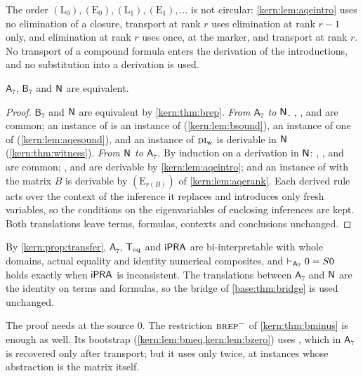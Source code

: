 The order $(\mathrm L_0),(\mathrm E_0),(\mathrm L_1),(\mathrm E_1),\dots$ is
not circular: \cref{kern:lem:aqeintro} uses no elimination of a closure,
transport at rank $r$ uses elimination at rank $r-1$ only, and elimination at
rank $r$ uses  once, at the marker, and transport at rank $r$.
No transport of a compound formula enters the derivation of the
introductions, and no substitution into a derivation is used.

\begin{theorem}
\label{kern:thm:aqe}
$\mathsf{A}_7$, $\mathsf{B}_7$ and $\mathsf{N}$ are equivalent.
\end{theorem}

\begin{proof}
$\mathsf{B}_7$ and $\mathsf{N}$ are equivalent by \cref{kern:thm:brep}.
\emph{From $\mathsf{A}_7$ to $\mathsf{N}$.}  , ,
 and  are common; an instance of  is
an instance of  (\cref{kern:lem:bsound}), an instance of
 one of  (\cref{kern:lem:aqesound}), and an instance
of $\rulename{DI}_{\mathrm{w}}$ is derivable in $\mathsf{N}$ (\cref{kern:thm:witness}).
\emph{From $\mathsf{N}$ to $\mathsf{A}_7$.}  By induction on a derivation in
$\mathsf{N}$: , ,  and  are
common; ,  and  are derivable by
\cref{kern:lem:aqeintro}; and an instance of  with the matrix
$B$ is derivable by $(\mathrm E_{r(B)})$ of \cref{kern:lem:aqerank}.  Each
derived rule acts over the context of the inference it replaces and
introduces only fresh variables, so the conditions on the eigenvariables of
enclosing inferences are kept.  Both translations leave terms, formulas,
contexts and conclusions unchanged.
\end{proof}

By \cref{kern:prop:transfer}, $\mathsf{A}_7$, $\mathsf{T}_{\mathrm{eq}}$ and $\mathsf{iPRA}$ are
bi-interpretable with whole domains, actual equality and identity numerical
composites, and $\vdash_{\mathsf{A}_7}0=S 0$ holds exactly when $\mathsf{iPRA}$
is inconsistent.  The translations between $\mathsf{A}_7$ and $\mathsf{N}$ are the
identity on terms and formulas, so the bridge of \cref{base:thm:bridge} is
used unchanged.

The proof needs  at the source $0$.  The restriction
$\rulename{BRep}^{-}$ of \cref{kern:thm:bminus} is enough as well.  Its
bootstrap (\cref{kern:lem:bmeq,kern:lem:bzero}) uses , which in
$\mathsf{A}_7$ is recovered only after transport; but it uses 
only twice, at instances whose abstraction is the matrix itself.

